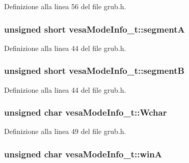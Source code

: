 Definizione alla linea 56 del file grub.\+h.

\hypertarget{structvesaModeInfo__t_af83d59348e11c50399f088cea83fb0a9}{
\subsubsection[{segment\+A}]{\setlength{\rightskip}{0pt plus 5cm}unsigned short vesa\+Mode\+Info\+\_\+t\+::segment\+A}}\label{structvesaModeInfo__t_af83d59348e11c50399f088cea83fb0a9}


Definizione alla linea 44 del file grub.\+h.

\hypertarget{structvesaModeInfo__t_a3f8f6fe3c4ee7fdbca2cf15883db343f}{
\subsubsection[{segment\+B}]{\setlength{\rightskip}{0pt plus 5cm}unsigned short vesa\+Mode\+Info\+\_\+t\+::segment\+B}}\label{structvesaModeInfo__t_a3f8f6fe3c4ee7fdbca2cf15883db343f}


Definizione alla linea 44 del file grub.\+h.

\hypertarget{structvesaModeInfo__t_a154546a781d9a7d5da7cc0b77a7b998c}{
\subsubsection[{Wchar}]{\setlength{\rightskip}{0pt plus 5cm}unsigned char vesa\+Mode\+Info\+\_\+t\+::\+Wchar}}\label{structvesaModeInfo__t_a154546a781d9a7d5da7cc0b77a7b998c}


Definizione alla linea 49 del file grub.\+h.

\hypertarget{structvesaModeInfo__t_ac056f64b4375a72439ae6e84aae88e7f}{
\subsubsection[{win\+A}]{\setlength{\rightskip}{0pt plus 5cm}unsigned char vesa\+Mode\+Info\+\_\+t\+::win\+A}}\label{structvesaModeInfo__t_ac056f64b4375a72439ae6e84aae88e7f}



